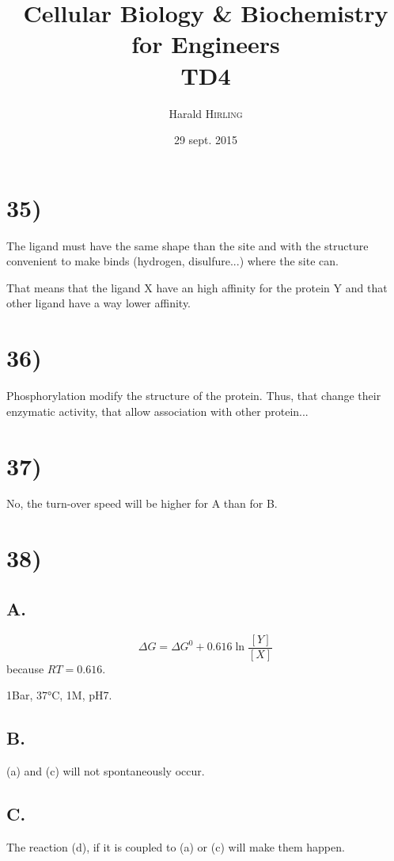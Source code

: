 

\title{Cellular Biology \& Biochemistry for Engineers\\TD4}
\author{Harald \textsc{Hirling}}
\date{29 sept. 2015}


\maketitle

\section*{35)}
The ligand must have the same shape than the site and with the structure convenient to make binds (hydrogen, disulfure...) where the site can.

That means that the ligand X have an high affinity for the protein Y and that other ligand have a way lower affinity.

\section*{36)}
Phosphorylation modify the structure of the protein. Thus, that change their enzymatic activity, that allow association with other protein... 

\section*{37)}
No, the turn-over speed will be higher for A than for B.

\section*{38)}
\subsection*{A.}
\[
    \Delta G = \Delta G^0 + 0.616 \ln \frac{[Y]}{[X]}
\]
because $RT = 0.616$.

1Bar, 37°C, 1M, pH7.

\subsection*{B.}
(a) and (c) will not spontaneously occur.

\subsection*{C.}
The reaction (d), if it is coupled to (a) or (c) will make them happen.

